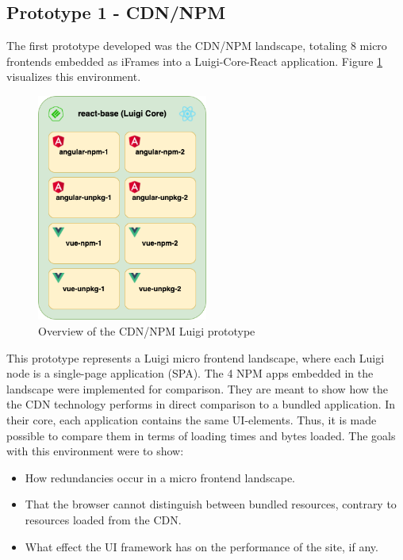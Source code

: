 \subsection{Prototype 1 - CDN/NPM}

The first prototype developed was the CDN/NPM landscape, totaling 8 micro frontends embedded as iFrames into a Luigi-Core-React application.
Figure \ref{fig:unpkg_prototype_architecture} visualizes this environment.
 
\begin{figure}[!h]
	\centering
	\includegraphics[width=0.5\textwidth]{Figures/unpkg.architecture.drawio.png}
	\caption{Overview of the CDN/NPM Luigi prototype}
	\label{fig:unpkg_prototype_architecture}
\end{figure}

This prototype represents a Luigi micro frontend landscape, where each Luigi node is a single-page application (SPA). 
The 4 NPM apps embedded in the landscape were implemented for comparison. They are meant to show how the the CDN technology performs in direct comparison to a bundled application.
In their core, each application contains the same UI-elements. Thus, it is made possible to compare them in terms of loading times and bytes loaded.
The goals with this environment were to show:

\begin{itemize}
	\item How redundancies occur in a micro frontend landscape.
	\item That the browser cannot distinguish between bundled resources, contrary to resources loaded from the CDN.
	\item What effect the UI framework has on the performance of the site, if any.
\end{itemize}

